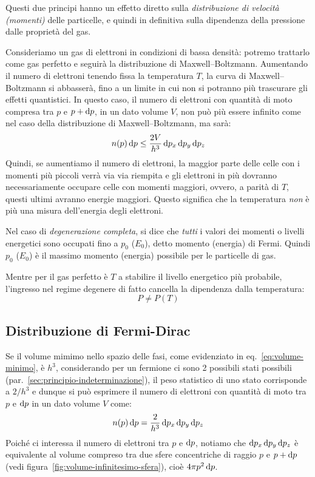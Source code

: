 Questi due principi hanno un effetto diretto sulla \emph{distribuzione di velocità (momenti)} delle particelle, e quindi in definitiva sulla dipendenza della pressione dalle proprietà del gas. 

Consideriamo un gas di elettroni in condizioni di bassa densità: potremo trattarlo come gas perfetto e seguirà la distribuzione di Maxwell--Boltzmann. Aumentando il numero di elettroni tenendo fissa la temperatura $T$, la curva di Maxwell--Boltzmann si abbasserà, fino a un limite in cui non si potranno più trascurare gli effetti quantistici. In questo caso, il numero di elettroni con quantità di moto compresa tra $p$ e $p + \mathop{\mathrm{{}d}}\mathopen{} p$, in  un dato volume $V$, non può più essere infinito come nel caso della distribuzione di Maxwell--Boltzmann, ma sarà:
\[
n(p) \mathop{\mathrm{{}d}}\mathopen{} p \leq \frac{2V}{h^3} \mathop{\mathrm{{}d}}\mathopen{} p_x \mathop{\mathrm{{}d}}\mathopen{} p_y \mathop{\mathrm{{}d}}\mathopen{} p_z
\]
Quindi, se aumentiamo il numero di elettroni, la maggior parte delle celle con i momenti più piccoli verrà via via riempita e gli elettroni in più dovranno necessariamente occupare celle con momenti maggiori, ovvero, a parità di $T$, questi ultimi avranno energie maggiori. Questo significa che la temperatura \emph{non} è più una misura dell'energia degli elettroni. 

Nel caso di \emph{degenerazione completa}, si dice che \emph{tutti}
i valori dei momenti o livelli energetici sono occupati fino a $p_0$ ($E_0$), detto momento (energia) di Fermi. Quindi $p_0$ ($E_0$) è il massimo momento (energia) possibile per le particelle di gas. 

Mentre per il gas perfetto è $T$ a stabilire il livello energetico più probabile, l'ingresso nel regime degenere di fatto cancella la dipendenza dalla temperatura:
\[
P \neq P(T)
\]

\subsection{Distribuzione di Fermi-Dirac}
Se il volume mimimo nello spazio delle fasi, come evidenziato in eq.~\eqref{eq:volume-minimo}, è $h^3$, considerando per un fermione ci sono 2 possibili stati possibili (par.~\ref{sec:principio-indeterminazione}), il peso statistico di uno stato corrisponde a $2 / h^3$ e dunque si può esprimere il numero di elettroni con quantità di moto tra $p$ e $\mathop{\mathrm{{}d}}\mathopen{} p$ in un dato volume $V$ come:
\[
n(p) \mathop{\mathrm{{}d}}\mathopen{} p = \frac{2}{h^3} \mathop{\mathrm{{}d}}\mathopen{} p_x \mathop{\mathrm{{}d}}\mathopen{} p_y \mathop{\mathrm{{}d}}\mathopen{} p_z
\]
Poiché ci interessa il numero di elettroni tra $p$ e $\mathop{\mathrm{{}d}}\mathopen{} p$, notiamo che $\mathop{\mathrm{{}d}}\mathopen{} p_x \mathop{\mathrm{{}d}}\mathopen{} p_y \mathop{\mathrm{{}d}}\mathopen{} p_z$ è equivalente al volume compreso tra due sfere concentriche di raggio $p$ e $p + \mathop{\mathrm{{}d}}\mathopen{} p$ (vedi figura~\ref{fig:volume-infinitesimo-sfera}), cioè $4 \pi p^2 \mathop{\mathrm{{}d}}\mathopen{} p$. 

